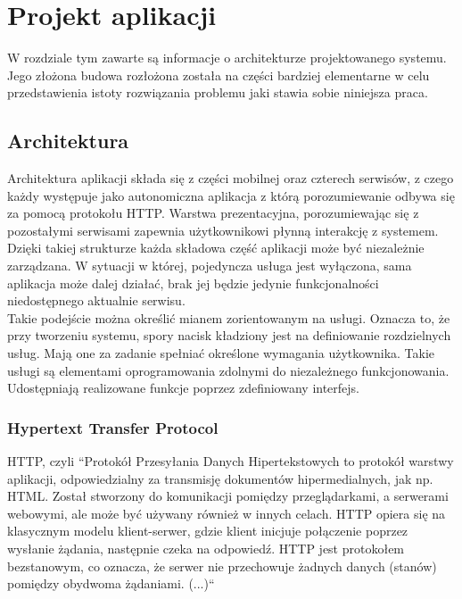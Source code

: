\chapter{Projekt aplikacji}
W rozdziale tym zawarte są informacje o architekturze projektowanego systemu. Jego złożona budowa rozłożona została na części bardziej elementarne w celu przedstawienia istoty rozwiązania problemu jaki stawia sobie niniejsza praca.
\section{Architektura}
Architektura aplikacji składa się z części mobilnej oraz czterech serwisów, z czego każdy występuje jako autonomiczna aplikacja z którą porozumiewanie odbywa się za pomocą protokołu HTTP. Warstwa prezentacyjna, porozumiewając się z pozostałymi serwisami zapewnia użytkownikowi płynną interakcję z systemem. Dzięki takiej strukturze każda składowa część aplikacji może być niezależnie zarządzana. W sytuacji w której, pojedyncza usługa jest wyłączona, sama aplikacja może dalej działać, brak jej będzie jedynie funkcjonalności niedostępnego aktualnie serwisu.\\
Takie podejście można określić mianem zorientowanym na usługi. Oznacza to, że przy tworzeniu systemu, spory nacisk kładziony jest na definiowanie rozdzielnych usług. Mają one za zadanie spełniać określone wymagania użytkownika. Takie usługi są elementami oprogramowania zdolnymi do niezależnego funkcjonowania. Udostępniają realizowane funkcje poprzez zdefiniowany interfejs.
\subsection{Hypertext Transfer Protocol}
HTTP, czyli ``Protokół Przesyłania Danych Hipertekstowych to protokół warstwy aplikacji, odpowiedzialny za transmisję dokumentów hipermedialnych, jak np. HTML. Został stworzony do komunikacji pomiędzy przeglądarkami, a serwerami webowymi, ale może być używany również w innych celach. HTTP opiera się na klasycznym modelu klient-serwer, gdzie klient inicjuje połączenie poprzez wysłanie żądania, następnie czeka na odpowiedź. HTTP jest protokołem bezstanowym, co oznacza, że serwer nie przechowuje żadnych danych (stanów) pomiędzy obydwoma żądaniami. (...)``~~\cite{http}


